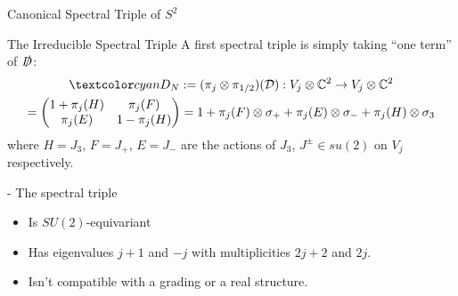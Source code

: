 \begin{frame}{Canonical Spectral Triple of $S^2$}
\end{frame}

\begin{frame}{The Irreducible Spectral Triple} %
A first spectral triple is simply taking ``one term'' of $\slashed D$:
\begin{multline}
    \lbtext{D_N} 
    := (\pi_j \otimes \pi_{1/2})(\mathcal D): V_j \otimes \CC^2 \to V_j \otimes \CC^2 \\
    = \begin{pmatrix} 1 + \pi_j(H) & \pi_j(F) \\ \pi_j(E) & 1 - \pi_j(H)\end{pmatrix} 
    = 1 + \pi_j(F) \otimes \sigma_+ + \pi_j(E) \otimes \sigma_- + \pi_j(H) \otimes \sigma_3
\end{multline} where $H = J_3$, $F = J_+$, $E = J_-$ are the actions of $J_3$, $J^\pm \in su(2)$ on $V_j$ respectively.

- The spectral triple 
    \begin{itemize}
        
    \item Is $SU(2)$-equivariant
    
    \item Has eigenvalues $j+1$ and $-j$ with multiplicities $2j+2$ and $2j$.
        
    \item Isn't compatible with a grading or a real structure.
    \end{itemize}

\end{frame}

